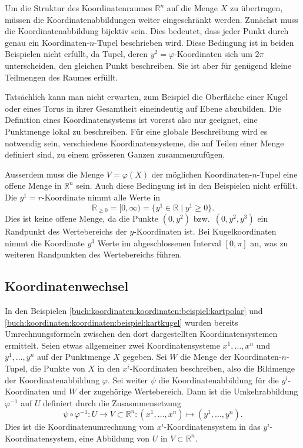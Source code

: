 Um die Struktur des Koordinatenraumes $\mathbb{R}^n$ auf die Menge
$X$ zu übertragen, müssen die Koordinatenabbildungen weiter eingeschränkt
werden.
Zunächst muss die Koordinatenabbildung bijektiv sein.
Dies bedeutet, dass jeder Punkt durch genau ein Koordinaten-$n$-Tupel
beschrieben wird.
Diese Bedingung ist in beiden Beispielen nicht erfüllt, da Tupel,
deren $y^2=\varphi$-Koordinaten sich um $2\pi$ unterscheiden, den
gleichen Punkt beschreiben.
Sie ist aber für genügend kleine Teilmengen des Raumes erfüllt.

Tatsächlich kann man nicht erwarten, zum Beispiel die Oberfläche einer
Kugel oder eines Torus in ihrer Gesamtheit eineindeutig auf Ebene
abzubilden.
Die Definition eines Koordinatensystems ist vorerst also nur geeignet,
eine Punktmenge lokal zu beschreiben.
Für eine globale Beschreibung wird es notwendig sein, verschiedene
Koordinatensysteme, die auf Teilen einer Menge definiert sind, zu
einem grösseren Ganzen zusammenzufügen.

Ausserdem muss die Menge $V=\varphi(X)$ der möglichen Koordinaten-$n$-Tupel
eine offene Menge in $\mathbb{R}^n$ sein.
Auch diese Bedingung ist in den Beispielen nicht erfüllt.
Die $y^1=r$-Koordinate nimmt alle Werte in
\[
\mathbb{R}_{\ge 0}
=
[0,\infty)
=
\{
y^1\in\mathbb{R}
\mid
y^1\ge 0
\}.
\]
Dies ist keine offene Menge, da die Punkte $(0,y^2)$ bzw.~$(0,y^2,y^3)$
ein Randpunkt des Wertebereichs der $y$-Koordinaten ist.
Bei Kugelkoordinaten nimmt die Koordinate $y^3$ Werte im
abgeschlossenen Interval $[0,\pi]$ an, was zu weiteren Randpunkten
des Wertebereichs führen.


%
%
\subsection{Koordinatenwechsel}
In den Beispielen
\ref{buch:koordinaten:koordinaten:beispiel:kartpolar}
und
\ref{buch:koordinaten:koordinaten:beispiel:kartkugel}
wurden bereits Umrechnungsformeln zwischen den dort dargestellten
Koordinatensystemen ermittelt.
Seien etwas allgemeiner zwei Koordinatensysteme $x^1,\dots,x^n$
und $y^1,\dots,y^n$ auf der Punktmenge $X$ gegeben.
Sei $W$ die Menge der Koordinaten-$n$-Tupel, die Punkte von $X$
in den $x^i$-Koordinaten beschreiben, also die Bildmenge der
Koordinatenabbildung $\varphi$.
Sei weiter $\psi$ die Koordinatenabbildung für die $y^i$-Koordinaten
und $W$ der zugehörige Wertebereich.
Dann ist die Umkehrabbildung $\varphi^{-1}$ auf $U$ definiert durch die
Zusasmmensetzung
\[
\psi
\circ
\varphi^{-1}
\colon
U\to V\subset\mathbb{R}^n
:
(x^1,\dots,x^n)
\mapsto
(y^1,\dots,y^n).
\]
Dies ist die Koordinatenumrechnung vom $x^i$-Koordinatensystem in
das $y^i$-Koordinatensystem, eine Abbildung von $U$ in $V\subset\mathbb{R}^n$.

